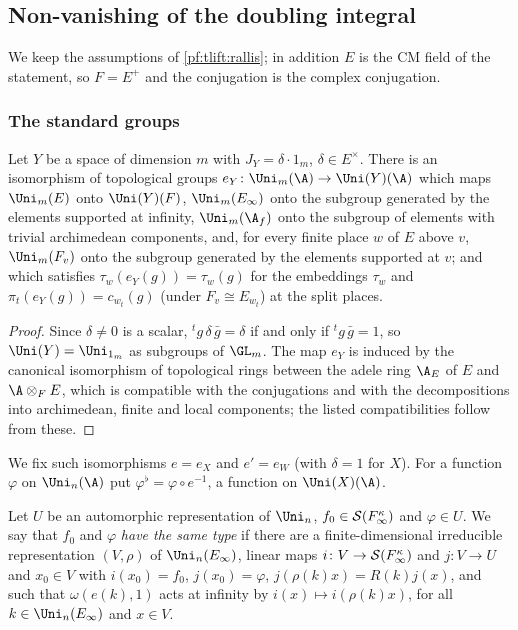 \subsection{Non-vanishing of the doubling integral}\label{pf:tlift:nonvan}

We keep the assumptions of \cref{pf:tlift:rallis}; in addition $E$ is the CM field of the statement, so
$F=E^+$ and the conjugation is the complex conjugation.

\subsubsection*{The standard groups}
\begin{lemma}\label{pf:tlift:brex}
Let $Y$ be a space of dimension $m$ with $J_Y=\delta\cdot1_m$, $\delta\in E^\times$. There is an isomorphism of
topological groups $e_Y\colon\Uni_m(\A)\to\Uni(Y)(\A)$ which maps $\Uni_m(E)$ onto $\Uni(Y)(F)$, $\Uni_m(E_\infty)$ onto
the subgroup generated by the elements supported at infinity, $\Uni_m(\A_f)$ onto the subgroup of elements with
trivial archimedean components, and, for every finite place $w$ of $E$ above $v$, $\Uni_m(F_v)$ onto the subgroup
generated by the elements supported at $v$; and which satisfies $\tau_w(e_Y(g))=\tau_w(g)$ for the embeddings
$\tau_w$ and $\pi_t(e_Y(g))=c_{w_t}(g)$ (under $F_v\cong E_{w_t}$) at the split places.
\end{lemma}

\begin{proof}
Since $\delta\ne0$ is a scalar, ${}^tg\,\delta\,\bar g=\delta$ if and only if ${}^tg\,\bar g=1$, so $\Uni(Y)=\Uni_{1_m}$ as subgroups of
$\GL_m$. The map $e_Y$ is induced by the canonical isomorphism of topological rings between the adele ring
$\A_E$ of $E$ and $\A\otimes_FE$, which is compatible with the conjugations and with the decompositions into
archimedean, finite and local components; the listed compatibilities follow from these.
\end{proof}

We fix such isomorphisms $e=e_X$ and $e'=e_W$ (with $\delta=1$ for $X$). For a function $\varphi$ on $\Uni_n(\A)$ put
$\varphi^\flat=\varphi\circ e^{-1}$, a function on $\Uni(X)(\A)$.

\begin{definition}\label{pf:tlift:sametype}
Let $U$ be an automorphic representation of $\Uni_n$, $f_0\in\mathcal{S}(F_\infty^\kappa)$ and $\varphi\in U$. We say that
$f_0$ and $\varphi$ \emph{have the same type} if there are a finite-dimensional irreducible representation
$(V,\rho)$ of $\Uni_n(E_\infty)$, linear maps $i\colon V\to\mathcal{S}(F_\infty^\kappa)$ and $j\colon V\to U$ and $x_0\in V$ with
$i(x_0)=f_0$, $j(x_0)=\varphi$, $j(\rho(k)x)=R(k)j(x)$, and such that $\omega(e(k),1)$ acts at infinity by
$i(x)\mapsto i(\rho(k)x)$, for all $k\in\Uni_n(E_\infty)$ and $x\in V$.
\end{definition}

